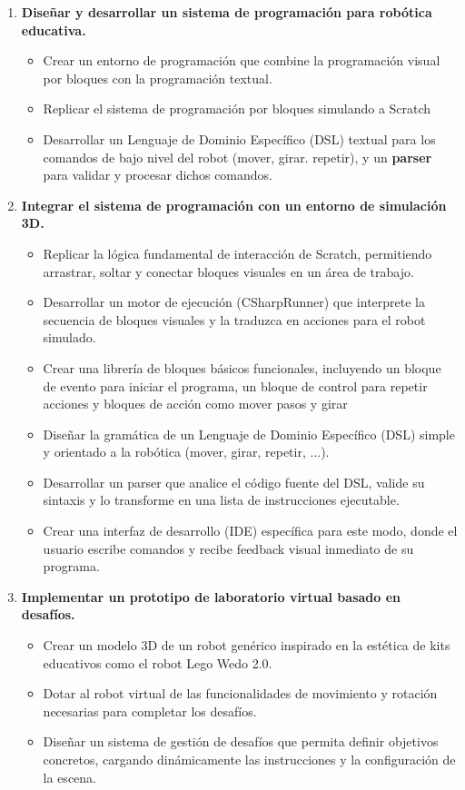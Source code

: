 \begin{enumerate}
	\item \textbf{Diseñar y desarrollar un sistema de programación para robótica educativa.}
	\begin{itemize}
		\item Crear un entorno de programación que combine la programación visual por bloques con la programación textual.
		\item Replicar el sistema de programación por bloques simulando a Scratch
		\item Desarrollar un Lenguaje de Dominio Específico (DSL) \cite{DSL} \cite{lenguaje_DSL}  textual para los comandos de bajo nivel del robot (mover, girar. repetir), y un \textbf{parser} para validar y procesar dichos comandos.
	\end{itemize}

\item \textbf{Integrar el sistema de programación con un entorno de simulación 3D.}
\begin{itemize}
	\item  Replicar la lógica fundamental de interacción de Scratch, permitiendo arrastrar, soltar y conectar bloques visuales en un área de trabajo.
	\item Desarrollar un motor de ejecución (CSharpRunner) que interprete la secuencia de bloques visuales y la traduzca en acciones para el robot simulado.
	\item Crear una librería de bloques básicos funcionales, incluyendo un bloque de evento para iniciar el programa, un bloque de control para repetir acciones y bloques de acción como mover pasos y girar
	\item Diseñar la gramática de un Lenguaje de Dominio Específico (DSL) simple y orientado a la robótica (mover, girar, repetir, ...).
	\item Desarrollar un parser que analice el código fuente del DSL, valide su sintaxis y lo transforme en una lista de instrucciones ejecutable.
	\item Crear una interfaz de desarrollo (IDE) específica para este modo, donde el usuario escribe comandos y recibe feedback visual inmediato de su programa.
\end{itemize}

\item \textbf{Implementar un prototipo de laboratorio virtual basado en desafíos.}
\begin{itemize}
	\item Crear un modelo 3D de un robot genérico inspirado en la estética de kits educativos como el robot Lego Wedo 2.0.
	\item Dotar al robot virtual de las funcionalidades de movimiento y rotación necesarias para completar los desafíos.
	\item Diseñar un sistema de gestión de desafíos que permita definir objetivos concretos, cargando dinámicamente las instrucciones y la configuración de la escena.
\end{itemize}
\end{enumerate}

